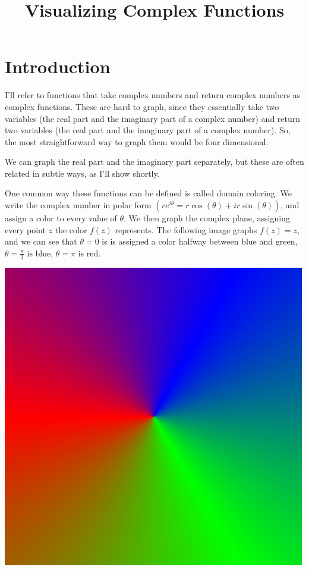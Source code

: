\documentclass[xhtml, mathjax]{article}
\title{Visualizing Complex Functions}
\author{}
\date{}
\begin{document}
  \EndCssFile
  \section{Introduction}

  I'll refer to functions that take complex numbers and return complex numbers
  as complex functions. These are hard to graph, since they essentially take two
  variables (the real part and the imaginary part of a complex number) and
  return two variables (the real part and the imaginary part of a complex
  number). So, the most straightforward way to graph them would be four
  dimensional.

  We can graph the real part and the imaginary part separately, but these are
  often related in subtle ways, as I'll show shortly.

  One common way these functions can be defined is called domain coloring. We
  write the complex number in polar form $(re^{i\theta} = r\cos(\theta) +
  ir\sin(\theta))$, and assign a color to every value of $\theta$. We then graph the
  complex plane, assigning every point $z$ the color $f(z)$ represents. The
  following image graphs $f(z) = z$, and we can see that $\theta = 0$ is is
  assigned a color halfway between blue and green, $\theta = \frac{\pi}{3}$ is
  blue, $\theta = \pi$ is red.

  \begin{center}
    \includegraphics{example1.gif}
  \end{center}
\end{document}
